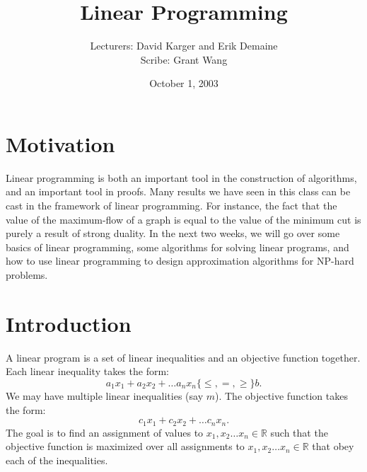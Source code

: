 \documentclass{article}
\title{Linear Programming}
\date{October 1, 2003}
\author{Lecturers: David Karger and Erik Demaine\\ Scribe: Grant Wang}
\newcommand{\reals}{\mathbb{R}}
\begin{document}
%
%
%
%

%



\section{Motivation}

Linear programming is both an important tool in the construction of
algorithms, and an important tool in proofs.  Many results we have
seen in this class can be cast in the framework of linear programming.
For instance, the fact that the value of the maximum-flow of a graph
is equal to the value of the minimum cut is purely a result of strong
duality.  In the next two weeks, we will go over some basics of linear
programming, some algorithms for solving linear programs, and how to
use linear programming to design approximation algorithms for NP-hard
problems.

\section{Introduction}

A linear program is a set of linear inequalities and an objective
function together.  Each linear inequality takes the form:
$$a_1 x_1 + a_2 x_2 + \dots a_n x_n \{\leq,=,\geq \} b.$$
We may have
multiple linear inequalities (say $m$).  The objective function takes
the form:
$$c_1 x_1 + c_2 x_2 + \dots c_n x_n.$$
The goal is to find an
assignment of values to $x_1, x_2 \dots x_n \in \reals$ such that the
objective function is maximized over all assignments to $x_1, x_2
\dots x_n \in \reals$ that obey each of the inequalities.
\end{document}
